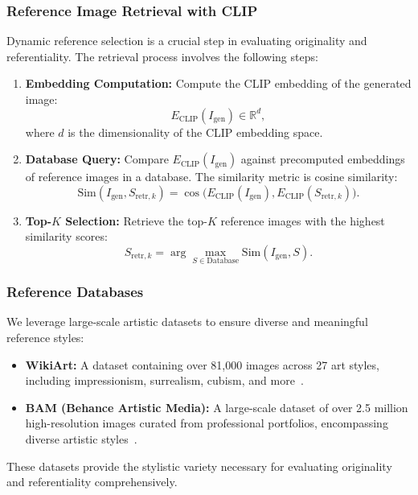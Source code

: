 \subsubsection{Reference Image Retrieval with CLIP}
Dynamic reference selection is a crucial step in evaluating originality and referentiality. The retrieval process involves the following steps:
\begin{enumerate}
    \item \textbf{Embedding Computation:} Compute the CLIP embedding of the generated image:
    \[
    E_{\text{CLIP}}(I_{\text{gen}}) \in \mathbb{R}^d,
    \]
    where \(d\) is the dimensionality of the CLIP embedding space.
    \item \textbf{Database Query:} Compare \(E_{\text{CLIP}}(I_{\text{gen}})\) against precomputed embeddings of reference images in a database. The similarity metric is cosine similarity:
    \[
    \text{Sim}(I_{\text{gen}}, S_{\text{retr},k}) = \cos\bigl(E_{\text{CLIP}}(I_{\text{gen}}), E_{\text{CLIP}}(S_{\text{retr},k})\bigr).
    \]
    \item \textbf{Top-\(K\) Selection:} Retrieve the top-\(K\) reference images with the highest similarity scores:
    \[
    S_{\text{retr},k} = \arg\max_{S \in \text{Database}} \text{Sim}(I_{\text{gen}}, S).
    \]
\end{enumerate}


\subsubsection{Reference Databases}
We leverage large-scale artistic datasets to ensure diverse and meaningful reference styles:
\begin{itemize}
    \item \textbf{WikiArt:} A dataset containing over 81,000 images across 27 art styles, including impressionism, surrealism, cubism, and more~\cite{saleh2015large}.
    \item \textbf{BAM (Behance Artistic Media):} A large-scale dataset of over 2.5 million high-resolution images curated from professional portfolios, encompassing diverse artistic styles~\cite{wilber2017bam}.
\end{itemize}
These datasets provide the stylistic variety necessary for evaluating originality and referentiality comprehensively.


